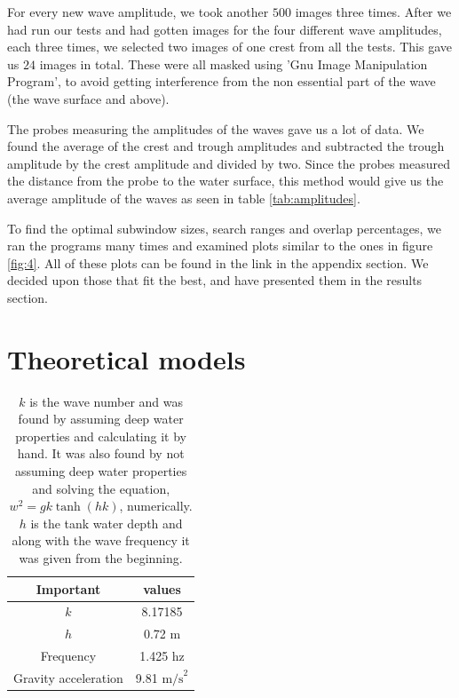 \documentclass[english,a4paper,12pt]{article}
\begin{document}
For every new wave amplitude, we took another $500$ images three times. After we had run our tests and had gotten images for the four different wave amplitudes, each three times, we selected two images of one crest from all the tests. This gave us $24$ images in total. These were all masked  using 'Gnu Image Manipulation Program', to avoid getting interference from the non essential part of the wave (the wave surface and above). \\ \bigskip

The probes measuring the amplitudes of the waves gave us a lot of data. We found the average of the crest and trough amplitudes and subtracted the trough amplitude by the crest amplitude and divided by two. Since the probes measured the distance from the probe to the water surface, this method would give us the average amplitude of the waves as seen in table \ref{tab:amplitudes}. \\ \bigskip

To find the optimal subwindow sizes, search ranges and overlap percentages, we ran the programs many times and examined plots similar to the ones in figure \ref{fig:4}. All of these plots can be found in the link in the appendix section. We decided upon those that fit the best, and have presented them in the results section.

\section*{Theoretical models}

\begin{table}[H]
    \centering
    \begin{tabular}{|c|c|} \hline
    Important & values \\ \hline \hline
$k$ & 8.17185   \\ \hline
$h$ & 0.72 m \\ \hline
Frequency & 1.425 hz \\ \hline
Gravity acceleration & 9.81 $\text{m/s}^2$ \\ \hline
    \end{tabular}
    \caption{$k$ is the wave number and was found by assuming deep water properties and calculating it by hand. It was also found by not assuming deep water properties and solving the equation, $w^{2} = gk\tanh(hk)$, numerically.
    $h$ is the tank water depth and along with the wave frequency it was given from the beginning. }
    \label{tab:values}
\end{table}
\end{document}

